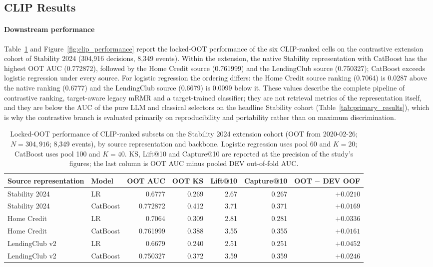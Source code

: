 \documentclass[preprint,12pt]{elsarticle}
\newcommand{\Kfeat}{K}
\begin{document}
\subsection{CLIP Results}
\label{subsec:clip_results}

\paragraph{Downstream performance}
Table~\ref{tab:clip_performance} and Figure~\ref{fig:clip_performance} report the locked-OOT performance of the six CLIP-ranked cells on the contrastive extension cohort of Stability 2024 (304,916 decisions, 8,349 events). Within the extension, the native Stability representation with CatBoost has the highest OOT AUC (0.772872), followed by the Home Credit source (0.761999) and the LendingClub source (0.750327); CatBoost exceeds logistic regression under every source. For logistic regression the ordering differs: the Home Credit source ranking (0.7064) is 0.0287 above the native ranking (0.6777) and the LendingClub source (0.6679) is 0.0099 below it. These values describe the complete pipeline of contrastive ranking, target-aware legacy mRMR and a target-trained classifier; they are not retrieval metrics of the representation itself, and they are below the AUC of the pure LLM and classical selectors on the headline Stability cohort (Table~\ref{tab:primary_results}), which is why the contrastive branch is evaluated primarily on reproducibility and portability rather than on maximum discrimination.

\begin{table}[htbp]
\centering
\scriptsize
\setlength{\tabcolsep}{4pt}
\begin{threeparttable}
\caption{Locked-OOT performance of CLIP-ranked subsets on the Stability 2024 extension cohort (OOT from 2020-02-26; $N=304{,}916$; 8,349 events), by source representation and backbone. Logistic regression uses pool 60 and $\Kfeat=20$; CatBoost uses pool 100 and $\Kfeat=40$. KS, Lift@10 and Capture@10 are reported at the precision of the study's figures; the last column is OOT AUC minus pooled DEV out-of-fold AUC.}
\label{tab:clip_performance}
\begin{tabular}{@{}llrrrrr@{}}
\toprule
Source representation & Model & OOT AUC & OOT KS & Lift@10 & Capture@10 & OOT $-$ DEV OOF \\
\midrule
Stability 2024 & LR & 0.6777 & 0.269 & 2.67 & 0.267 & $+0.0210$ \\
Stability 2024 & CatBoost & 0.772872 & 0.412 & 3.71 & 0.371 & $+0.0169$ \\
Home Credit & LR & 0.7064 & 0.309 & 2.81 & 0.281 & $+0.0336$ \\
Home Credit & CatBoost & 0.761999 & 0.388 & 3.55 & 0.355 & $+0.0161$ \\
LendingClub v2 & LR & 0.6679 & 0.240 & 2.51 & 0.251 & $+0.0452$ \\
LendingClub v2 & CatBoost & 0.750327 & 0.372 & 3.59 & 0.359 & $+0.0246$ \\
\bottomrule
\end{tabular}
\end{threeparttable}
\end{table}
\end{document}
